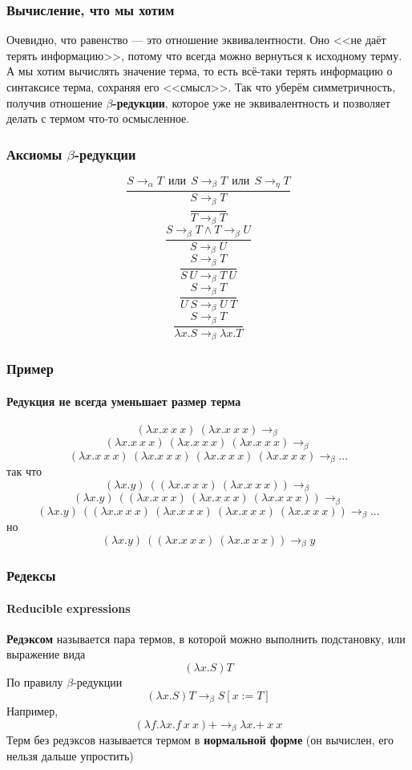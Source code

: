 \documentclass[xetex,mathserif,serif]{beamer}
\begin{document}
    \begin{frame}
        \frametitle{Вычисление, что мы хотим}
        Очевидно, что равенство --- это отношение эквивалентности. Оно <<не даёт терять
        информацию>>, потому что всегда можно вернуться к исходному терму. А мы хотим 
        вычислять значение терма, то есть всё-таки терять информацию о синтаксисе 
        терма, сохраняя	его <<смысл>>. Так что уберём симметричность, получив 
        отношение \textbf{$\beta$-редукции}, которое уже не эквивалентность и позволяет 
        делать с термом что-то осмысленное.
    \end{frame}

    \begin{frame}
        \frametitle{Аксиомы $\beta$-редукции}
        $$\dfrac{S \rightarrow_\alpha T\ \ 
            \mbox{или}\ \ S \rightarrow_\beta T\ \ 
            \mbox{или}\ \  S \rightarrow_\eta T}{S \rightarrow_\beta T}$$ 
        $$\dfrac{}{T \rightarrow_\beta T}$$
        $$\dfrac{S \rightarrow_\beta T \wedge T \rightarrow_\beta U}{S \rightarrow_\beta U}$$
        $$\dfrac{S \rightarrow_\beta T}{S\ U \rightarrow_\beta T\ U}$$
        $$\dfrac{S \rightarrow_\beta T}{U\ S \rightarrow_\beta U\ T}$$
        $$\dfrac{S \rightarrow_\beta T}{\lambda x.S \rightarrow_\beta \lambda x.T}$$
    \end{frame}

    \begin{frame}
        \frametitle{Пример}
        \framesubtitle{Редукция не всегда уменьшает размер терма}
        $$(\lambda x.x\ x\ x)\ (\lambda x.x\ x\ x) \rightarrow_\beta$$ 
        $$(\lambda x.x\ x\ x)\ (\lambda x.x\ x\ x)\ (\lambda x.x\ x\ x) \rightarrow_\beta$$
        $$(\lambda x.x\ x\ x)\ (\lambda x.x\ x\ x)\ (\lambda x.x\ x\ x)\ (\lambda x.x\ x\ x) \rightarrow_\beta ...$$
        так что 
        $$(\lambda x.y)\ ((\lambda x.x\ x\ x)\ (\lambda x.x\ x\ x)) \rightarrow_\beta$$ 
        $$(\lambda x.y)\ ((\lambda x.x\ x\ x)\ (\lambda x.x\ x\ x)\ (\lambda x.x\ x\ x)) \rightarrow_\beta$$
        $$(\lambda x.y)\ ((\lambda x.x\ x\ x)\ (\lambda x.x\ x\ x)\ (\lambda x.x\ x\ x)\ (\lambda x.x\ x\ x)) \rightarrow_\beta ...$$
        но
        $$(\lambda x.y)\ ((\lambda x.x\ x\ x)\ (\lambda x.x\ x\ x)) \rightarrow_\beta y$$		
    \end{frame}
    
    \begin{frame}
        \frametitle{Редексы}
        \framesubtitle{Reducible expressions}
        \textbf{Редэксом} называется пара термов, в которой можно выполнить подстановку, или выражение вида
        $$(\lambda x.S) T$$ 
        По правилу $\beta$-редукции 
        $$(\lambda x.S) T \rightarrow_\beta S[x := T]$$
        Например,
        $$(\lambda f.\lambda x.f\ x\ x) \textbf{+} \rightarrow_\beta \lambda x.\textbf{+}\ x\ x$$
        Терм без редэксов называется термом в \textbf{нормальной форме} (он вычислен, его нельзя дальше упростить)
    \end{frame}
\end{document}
